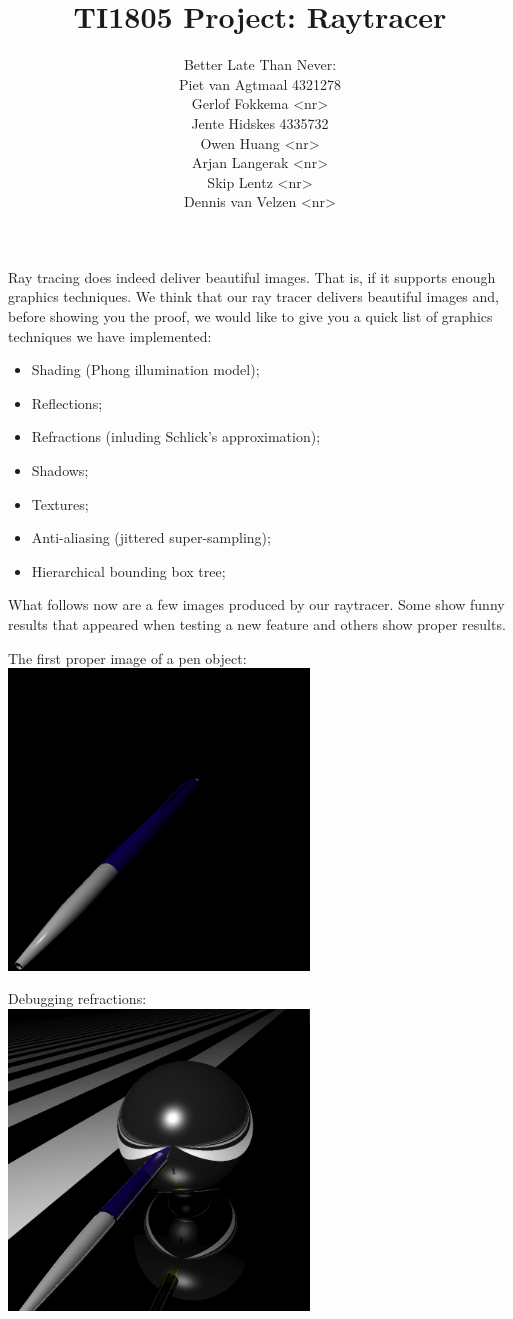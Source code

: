 \documentclass[a4paper,11pt]{article}
\title{TI1805 Project: Raytracer}
\author{Better Late Than Never:\\
		Piet van Agtmaal 4321278\\
		Gerlof Fokkema <nr>\\
		Jente Hidskes 4335732\\
		Owen Huang <nr>\\
		Arjan Langerak <nr>\\
		Skip Lentz <nr>\\
		Dennis van Velzen <nr>\\
	   }
\begin{document}
\maketitle
Ray tracing does indeed deliver beautiful images. That is, if it supports enough graphics techniques. We think that our ray tracer delivers beautiful images and, before showing you the proof, we would like to give you a quick list of graphics techniques we have implemented:
\begin{itemize}
	\item Shading (Phong illumination model);
	\item Reflections;
	\item Refractions (inluding Schlick's approximation);
	\item Shadows;
	\item Textures;
	\item Anti-aliasing (jittered super-sampling);
	\item Hierarchical bounding box tree;
\end{itemize}
What follows now are a few images produced by our raytracer. Some show funny results that appeared when testing a new feature and others show proper results.

\newpage The first proper image of a pen object:\\
\includegraphics[keepaspectratio,width=8.0cm]{images/interpolate_pen}

Debugging refractions:\\
\includegraphics[keepaspectratio,width=8.0cm]{images/master-plane-sphere-pen}\\
\end{document}
